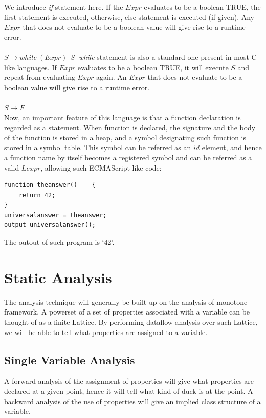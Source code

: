 \documentclass[a4paper,12pt]{article}
\begin{document}
We introduce \textit{if} statement here. If the $Expr$ evaluates to be a boolean TRUE, the first statement is executed, otherwise, else statement is executed (if given). Any $Expr$ that does not evaluate to be a boolean value will give rise to a runtime error.\\\\
$S \rightarrow while\ (Expr)\ {\ S\ }$
\textit{while} statement is also a standard one present in most C-like languages. If $Expr$ evaluates to be a boolean TRUE, it will execute $S$ and repeat from evaluating $Expr$ again. An $Expr$ that does not evaluate to be a boolean value will give rise to a runtime error.\\\\
$S \rightarrow F$\\
Now, an important feature of this language is that a function declaration is regarded as a statement. When function is declared, the signature and the body of the function is stored in a heap, and a symbol designating such function is stored in a symbol table. This symbol can be referred as an $id$ element, and hence a function name by itself becomes a registered symbol and can be referred as a valid $Lexpr$, allowing such ECMAScript-like code:\\
\medskip
\begin{lstlisting}[caption=Function declaration as a statement]
function theanswer()	{
	return 42;
}
universalanswer = theanswer;
output universalanswer();
\end{lstlisting}
The outout of such program is `42'.
\section{Static Analysis}
The analysis technique will generally be built up on the analysis of monotone framework. A powerset of a set of properties associated with a variable can be thought of as a finite Lattice. By performing dataflow analysis over such Lattice, we will be able to tell what properties are assigned to a variable.\\
\subsection{Single Variable Analysis}
A forward analysis of the assignment of properties will give what properties are declared at a given point, hence it will tell what kind of duck is at the point. A backward analysis of the use of properties will give an implied class structure of a variable.\\
\end{document}
